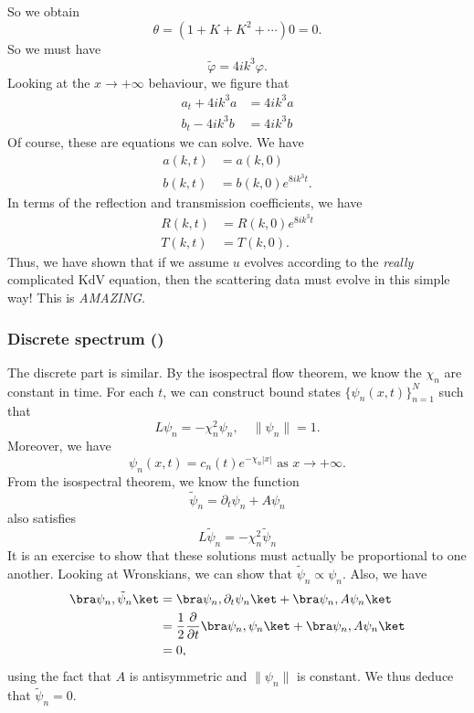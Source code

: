 \documentclass[a4paper]{article}
\begin{document}
So we obtain
\[
  \theta = (1 + K + K^2 + \cdots) 0 = 0.
\]
So we must have
\[
  \tilde{\varphi} = 4ik^3 \varphi.
\]
Looking at the $x \to +\infty$ behaviour, we figure that
\begin{align*}
  a_t + 4ik^3 a &= 4 ik^3 a\\
  b_t - 4ik^3 b &= 4ik^3 b
\end{align*}
Of course, these are equations we can solve. We have
\begin{align*}
  a(k, t) &= a(k, 0)\\
  b(k, t) &= b(k, 0) e^{8ik^3 t}.
\end{align*}
In terms of the reflection and transmission coefficients, we have
\begin{align*}
  R(k, t) &= R(k, 0) e^{8ik^3 t}\\
  T(k, t) &= T(k, 0).
\end{align*}
Thus, we have shown that if we assume $u$ evolves according to the \emph{really} complicated KdV equation, then the scattering data must evolve in this simple way! This is \emph{AMAZING}.

\subsubsection{Discrete spectrum ()}
The discrete part is similar. By the isospectral flow theorem, we know the $\chi_n$ are constant in time. For each $t$, we can construct bound states $\{\psi_n(x, t)\}_{n = 1}^N$ such that
\[
  L\psi_n = - \chi_n^2 \psi_n,\quad \|\psi_n\| = 1.
\]
Moreover, we have
\[
  \psi_n(x, t) = c_n(t) e^{-\chi_n|x|} \text{ as }x \to +\infty.
\]
From the isospectral theorem, we know the function
\[
  \tilde{\psi}_n = \partial_t \psi_n + A\psi_n
\]
also satisfies
\[
  L\tilde{\psi}_n = - \chi_n^2 \tilde{\psi}_n
\]
It is an exercise to show that these solutions must actually be proportional to one another. Looking at Wronskians, we can show that $\tilde{\psi}_n \propto \psi_n$. Also, we have
\begin{align*}
  \bra \psi_n, \tilde{\psi}_n\ket &= \bra \psi_n, \partial_t \psi_n\ket + \bra\psi_n, A \psi_n\ket\\
  &= \frac{1}{2} \frac{\partial}{\partial t} \bra \psi_n, \psi_n\ket + \bra \psi_n, A \psi_n\ket\\
  &= 0,
\end{align*}
using the fact that $A$ is antisymmetric and $\|\psi_n\|$ is constant. We thus deduce that $\tilde{\psi}_n = 0$.
\end{document}
